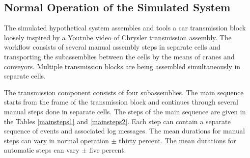 \documentclass[journal]{IEEEtran}
\begin{document}
\subsection{Normal Operation of the Simulated System}
The simulated hypothetical system assembles and tools a car transmission block loosely inspired by a Youtube video of Chrysler transmission assembly\cite{transmission}.
The workflow consists of several manual assembly steps in separate cells and transporting the subassemblies between the cells by the means of
cranes and conveyors. Multiple transmission blocks are being assembled simultaneously in separate cells.

The transmission component consists of four subassemblies. The main sequence starts from the frame of the transmission block
and continues through several manual steps done in separate cells. The steps of the main sequence are given in
the Tables \ref{mainsteps1} and \ref{mainsteps2}.
Each step can contain a separate sequence of events and associated log messages.
The mean durations for manual steps can vary in normal operation $\pm$ thirty percent. The mean durations for automatic steps can vary
$\pm$ five percent.
\end{document}
